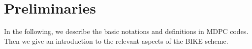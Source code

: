 \documentclass[runningheads]{llncs}
\begin{document}
\section{Preliminaries}
\label{sec::prelim}

In the following, we describe the basic notations and definitions
in MDPC codes. 
Then we give an introduction to the relevant aspects of the BIKE
scheme.


\newcommand{\tabincell}[2]{\begin{tabular}{@{}#1@{}}#2\end{tabular}}
\end{document}
